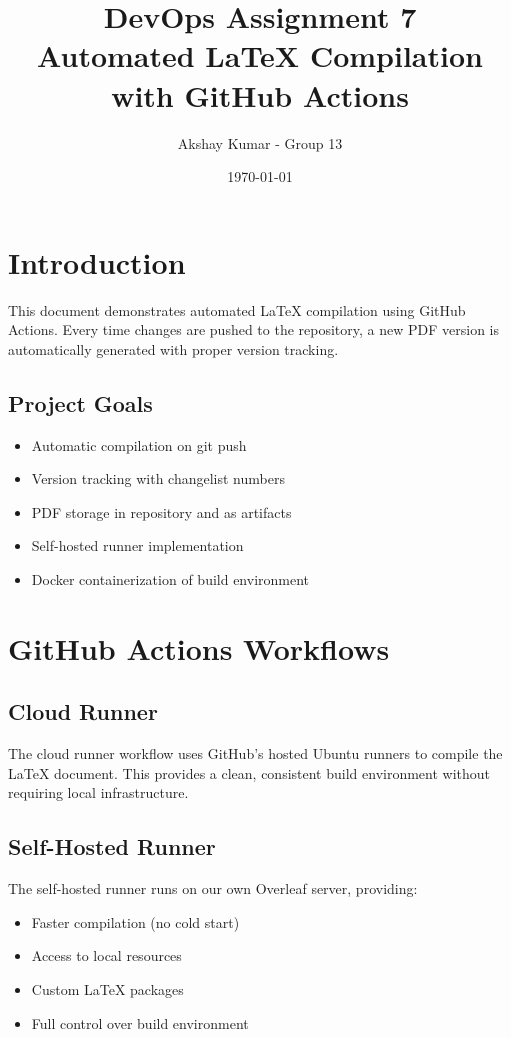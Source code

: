 \documentclass{article}
\title{DevOps Assignment 7 \\ Automated LaTeX Compilation with GitHub Actions \\ \small \gitversion}
\author{Akshay Kumar - Group 13}
\date{\today}
\begin{document}
\maketitle

\tableofcontents
\newpage

\section{Introduction}
This document demonstrates automated LaTeX compilation using GitHub Actions. Every time changes are pushed to the repository, a new PDF version is automatically generated with proper version tracking.

\subsection{Project Goals}
\begin{itemize}
    \item Automatic compilation on git push
    \item Version tracking with changelist numbers
    \item PDF storage in repository and as artifacts
    \item Self-hosted runner implementation
    \item Docker containerization of build environment
\end{itemize}

\section{GitHub Actions Workflows}

\subsection{Cloud Runner}
The cloud runner workflow uses GitHub's hosted Ubuntu runners to compile the LaTeX document. This provides a clean, consistent build environment without requiring local infrastructure.

\subsection{Self-Hosted Runner}
The self-hosted runner runs on our own Overleaf server, providing:
\begin{itemize}
    \item Faster compilation (no cold start)
    \item Access to local resources
    \item Custom LaTeX packages
    \item Full control over build environment
\end{itemize}
\end{document}
